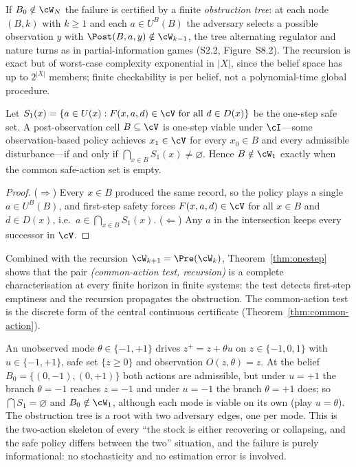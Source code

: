 If $B_0\notin\cW_N$ the failure is certified by a finite \emph{obstruction tree}: at each node $(B,k)$ with $k\ge1$ and each $a\in U^B(B)$ the adversary selects a possible observation $y$ with $\Post(B,a,y)\notin\cW_{k-1}$, the tree alternating regulator and nature turns as in partial-information games (S2.2, Figure~S8.2). The recursion is exact but of worst-case complexity exponential in $|X|$, since the belief space has up to $2^{|X|}$ members; finite checkability is per belief, not a polynomial-time global procedure.

\begin{theorem}\label{thm:onestep}
Let $S_1(x)=\{a\in U(x):F(x,a,d)\in\cV\ \text{for all }d\in D(x)\}$ be the one-step safe set. A post-observation cell $B\subseteq\cV$ is one-step viable under $\cI$---some observation-based policy achieves $x_1\in\cV$ for every $x_0\in B$ and every admissible disturbance---if and only if $\bigcap_{x\in B}S_1(x)\ne\varnothing$. Hence $B\notin\cW_1$ exactly when the common safe-action set is empty.
\end{theorem}

\begin{proof}
($\Rightarrow$) Every $x\in B$ produced the same record, so the policy plays a single $a\in U^B(B)$, and first-step safety forces $F(x,a,d)\in\cV$ for all $x\in B$ and $d\in D(x)$, i.e.\ $a\in\bigcap_{x\in B}S_1(x)$. ($\Leftarrow$) Any $a$ in the intersection keeps every successor in $\cV$.
\end{proof}

Combined with the recursion $\cW_{k+1}=\Pre(\cW_k)$, Theorem~\ref{thm:onestep} shows that the pair \emph{(common-action test, recursion)} is a complete characterisation at every finite horizon in finite systems: the test detects first-step emptiness and the recursion propagates the obstruction. The common-action test is the discrete form of the central continuous certificate (Theorem~\ref{thm:common-action}).

\begin{example}\label{ex:hidden-mode}
An unobserved mode $\theta\in\{-1,+1\}$ drives $z^+=z+\theta u$ on $z\in\{-1,0,1\}$ with $u\in\{-1,+1\}$, safe set $\{z\ge0\}$ and observation $O(z,\theta)=z$. At the belief $B_0=\{(0,-1),(0,+1)\}$ both actions are admissible, but under $u=+1$ the branch $\theta=-1$ reaches $z=-1$ and under $u=-1$ the branch $\theta=+1$ does; so $\bigcap S_1=\varnothing$ and $B_0\notin\cW_1$, although each mode is viable on its own (play $u=\theta$). The obstruction tree is a root with two adversary edges, one per mode. This is the two-action skeleton of every ``the stock is either recovering or collapsing, and the safe policy differs between the two'' situation, and the failure is purely informational: no stochasticity and no estimation error is involved.
\end{example}

